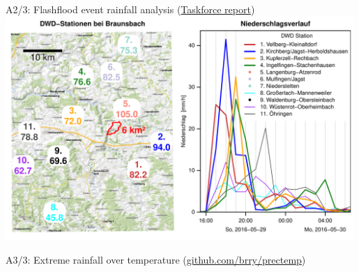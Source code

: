 \documentclass[compress, xcolor=dvipsnames]{beamer}\usepackage[]{graphicx}\usepackage[]{color}
\begin{document}
\begin{frame}[fragile]{A2/3: Flashflood event rainfall analysis (\href{http://www.uni-potsdam.de/natriskchange/qualification-program/task-force-braunsbach-flash-flood-2016.html}{Taskforce report})}
\label{ae}
\pause
\includegraphics[width=0.99\textwidth]{Rainfall_map_events.pdf}
\end{frame}


\begin{frame}{A3/3: Extreme rainfall over temperature (\href{https://github.com/brry/prectemp}{github.com/brry/prectemp})}
\label{ar}
\end{frame}
\end{document}
